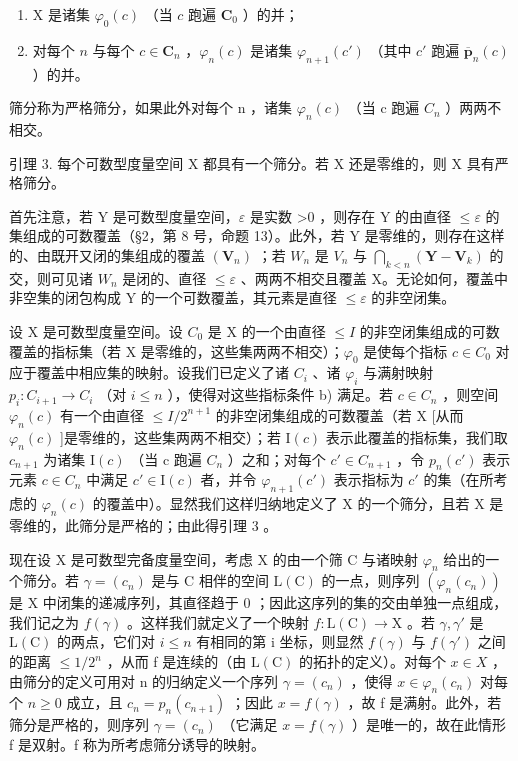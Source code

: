 \begin{enumerate}
\def\labelenumi{\alph{enumi})}
\item
  X 是诸集 \(\varphi_0(c)\) （当 \(c\) 跑遍 \(\mathbf{C}_0\) ）的并；
\item
  对每个 \(n\) 与每个 \(c \in \mathbf{C}_n\) ，\(\varphi_n(c)\) 是诸集 \(\varphi_{n+1}(c')\) （其中 \(c'\) 跑遍 \(\overline{\pmb{p}}_n(c)\) ）的并。
\end{enumerate}

筛分称为严格筛分，如果此外对每个 n ，诸集 \(\varphi_{n}(c)\) （当 c 跑遍 \(C_{n}\) ）两两不相交。

引理 3. 每个可数型度量空间 X 都具有一个筛分。若 X 还是零维的，则 X 具有严格筛分。

首先注意，若 Y 是可数型度量空间，\(\varepsilon\) 是实数 \textgreater0 ，则存在 Y 的由直径 \(\leqslant\varepsilon\) 的集组成的可数覆盖（§2，第 8 号，命题 13）。此外，若 Y 是零维的，则存在这样的、由既开又闭的集组成的覆盖 \((\mathbf{V}_{n})\) ；若 \(W_{n}\) 是 \(V_{n}\) 与 \(\bigcap_{k<n}(\mathbf{Y}-\mathbf{V}_{k})\) 的交，则可见诸 \(W_{n}\) 是闭的、直径 \(\leqslant\varepsilon\) 、两两不相交且覆盖 X。无论如何，覆盖中非空集的闭包构成 Y 的一个可数覆盖，其元素是直径 \(\leqslant\varepsilon\) 的非空闭集。

设 X 是可数型度量空间。设 \(C_{0}\) 是 X 的一个由直径 \(\leqslant I\) 的非空闭集组成的可数覆盖的指标集（若 X 是零维的，这些集两两不相交）；\(\varphi_{0}\) 是使每个指标 \(c \in C_{0}\) 对应于覆盖中相应集的映射。设我们已定义了诸 \(C_{i}\) 、诸 \(\varphi_{i}\) 与满射映射 \(p_{i}: C_{i+1} \to C_{i}\) （对 \(i \leqslant n\) ），使得对这些指标条件 b) 满足。若 \(c \in C_{n}\) ，则空间 \(\varphi_{n}(c)\) 有一个由直径 \(\leqslant I/2^{n+1}\) 的非空闭集组成的可数覆盖（若 X {[}从而 \(\varphi_{n}(c)\) {]}是零维的，这些集两两不相交）；若 \(\mathrm{I}(c)\) 表示此覆盖的指标集，我们取 \(c_{n+1}\) 为诸集 \(\mathrm{I}(c)\) （当 c 跑遍 \(C_{n}\) ）之和；对每个 \(c' \in C_{n+1}\) ，令 \(p_{n}(c')\) 表示元素 \(c \in C_{n}\) 中满足 \(c' \in \mathrm{I}(c)\) 者，并令 \(\varphi_{n+1}(c')\) 表示指标为 \(c'\) 的集（在所考虑的 \(\varphi_{n}(c)\) 的覆盖中）。显然我们这样归纳地定义了 X 的一个筛分，且若 X 是零维的，此筛分是严格的；由此得引理 3 。

现在设 X 是可数型完备度量空间，考虑 X 的由一个筛 C 与诸映射 \(\varphi_{n}\) 给出的一个筛分。若 \(\gamma = (c_{n})\) 是与 C 相伴的空间 \(\mathrm{L}(\mathrm{C})\) 的一点，则序列 \((\varphi_{n}(c_{n}))\) 是 X 中闭集的递减序列，其直径趋于 0 ；因此这序列的集的交由单独一点组成，我们记之为 \(f(\gamma)\) 。这样我们就定义了一个映射 \(f: \mathrm{L}(\mathrm{C}) \to \mathrm{X}\) 。若 \(\gamma, \gamma'\) 是 \(\mathrm{L}(\mathrm{C})\) 的两点，它们对 \(i \leqslant n\) 有相同的第 i 坐标，则显然 \(f(\gamma)\) 与 \(f(\gamma')\) 之间的距离 \(\leqslant 1/2^{n}\) ，从而 f 是连续的（由 \(\mathrm{L}(\mathrm{C})\) 的拓扑的定义）。对每个 \(x \in X\) ，由筛分的定义可用对 n 的归纳定义一个序列 \(\gamma = (c_{n})\) ，使得 \(x \in \varphi_{n}(c_{n})\) 对每个 \(n \geqslant 0\) 成立，且 \(c_{n} = p_{n}(c_{n+1})\) ；因此 \(x = f(\gamma)\) ，故 f 是满射。此外，若筛分是严格的，则序列 \(\gamma = (c_{n})\) （它满足 \(x = f(\gamma)\) ）是唯一的，故在此情形 f 是双射。f 称为所考虑筛分诱导的映射。

